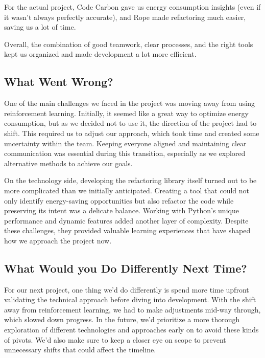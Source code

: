 \documentclass{article}
\begin{document}
For the actual project, Code Carbon gave us energy consumption insights (even if it 
wasn’t always perfectly accurate), and Rope made refactoring much easier, saving us a lot of time.

Overall, the combination of good teamwork, clear processes, and the right tools kept us 
organized and made development a lot more efficient.

\subsection{What Went Wrong?}


One of the main challenges we faced in the project was moving away from using 
reinforcement learning. Initially, it seemed like a great way to optimize energy 
consumption, but as we decided not to use it, the direction of the project had to 
shift. This required us to adjust our approach, which took time and created some 
uncertainty within the team. Keeping everyone aligned and maintaining clear 
communication was essential during this transition, especially as we explored 
alternative methods to achieve our goals.

On the technology side, developing the refactoring library itself turned out to 
be more complicated than we initially anticipated. Creating a tool that could not 
only identify energy-saving opportunities but also refactor the code while preserving 
its intent was a delicate balance. Working with Python's unique performance and 
dynamic features added another layer of complexity. Despite these challenges, they 
provided valuable learning experiences that have shaped how we approach the project now.

\subsection{What Would you Do Differently Next Time?}


For our next project, one thing we’d do differently is spend more time upfront 
validating the technical approach before diving into development. With the shift 
away from reinforcement learning, we had to make adjustments mid-way through, which 
slowed down progress. In the future, we’d prioritize a more thorough exploration of 
different technologies and approaches early on to avoid these kinds of pivots. We’d 
also make sure to keep a closer eye on scope to prevent unnecessary shifts that could 
affect the timeline.
\end{document}
